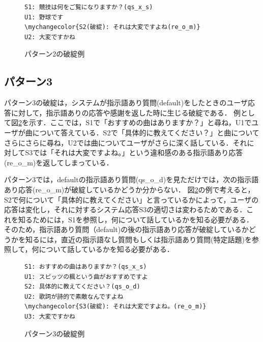 \documentclass[12pt,a4paper,twoside,openany]{jbook}
\newcommand\mychangecolor[1]{\textcolor[rgb]{1,0,0}{\textbf{#1}}}
\begin{document}
\begin{figure}[tb]
\begin{screen}
\centering
\begin{Verbatim}[commandchars=\\\{\}]
S1: 競技は何をご覧になりますか？(qs_x_s)
U1: 野球です
\mychangecolor{S2(破綻): それは大変ですよね(re_o_m)}
U2: 大変ですかね
\end{Verbatim}
\end{screen}
\caption{パターン2の破綻例}
\label{pattern2}
\end{figure}

\subsection*{パターン3}%


パターン3の破綻は，システムが指示語あり質問(default)をしたときのユーザ応答に対して，指示語ありの応答や感謝を返した時に生じる破綻である．
例として図\ref{pattern3}を示す．ここでは，S1で「おすすめの曲はありますか？」と尋ね，U1でユーザが曲について答えている．S2で「具体的に教えてください？」と曲についてさらにさらに尋ね，U2では曲についてユーザがさらに深く話している．それに対してS3では「それは大変ですよね。」という違和感のある指示語あり応答(re\_o\_m)を返してしまっている．

パターン3では，defaultの指示語あり質問(qs\_o\_d)を見ただけでは，次の指示語あり応答(re\_o\_m)が破綻しているかどうか分からない．
図\ref{pattern3}の例で考えると，S2で何について「具体的に教えてください」と言っているかによって，ユーザの応答は変化し，それに対するシステム応答S3の適切さは変わるためである．これを知るためには，S1を参照し，何について話しているかを知る必要がある．
そのため，指示語あり質問（default)の後の指示語あり応答が破綻しているかどうかを知るには，直近の指示語なし質問もしくは指示語あり質問(特定話題)を参照して，何について話しているかを知る必要がある．

\begin{figure}[tb]
\centering
\begin{screen}
\begin{Verbatim}[commandchars=\\\{\}]
S1: おすすめの曲はありますか？(qs_x_s)
U1: スピッツの楓という曲がおすすめですよ
S2: 具体的に教えてください？(qs_o_d) 
U2: 歌詞が詩的で素敵なんですよね 
\mychangecolor{S3(破綻): それは大変ですよね。(re_o_m)}
U3: 大変ですかね 
\end{Verbatim}
\end{screen}
\caption{パターン3の破綻例}
\label{pattern3}
\end{figure}
\end{document}
